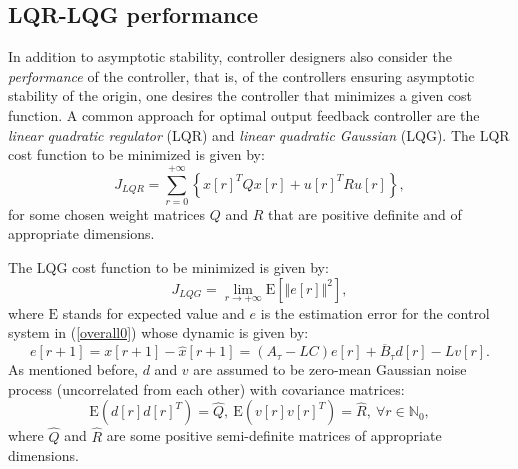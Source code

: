 \documentclass{amsart}
\numberwithin{equation}{section}
\newcommand{\N}{{\mathbb{N}}}
\begin{document}
\subsection{LQR-LQG performance}
In addition to asymptotic stability, controller designers also consider the {\em performance} of the controller,
that is, of the controllers ensuring asymptotic stability of the origin, one desires the controller that minimizes
a given cost function.
A common approach for optimal output feedback controller are the {\em linear quadratic regulator} (LQR) and {\em linear quadratic Gaussian} (LQG). 
The LQR cost function to be minimized is given by:
\begin{equation}
\label{LQR_cost}
J_{LQR}=\sum_{r=0}^{+\infty}\left\{x[r]^TQx[r]+u[r]^TRu[r]\right\},
\end{equation}
for some chosen weight matrices $Q$ and $R$ that are positive definite and of appropriate dimensions. 

The LQG cost function to be minimized is given by:
\begin{equation}\label{LQG}
J_{LQG}=\lim_{r\rightarrow+\infty}\text{E}\left[\Vert e[r]\Vert^2\right],
\end{equation}
where $\text{E}$ stands for expected value and $e$ is the estimation error for the control system in (\ref{overall0}) whose dynamic is given by:
\begin{equation}\label{stochastic_dyn}
e[r+1]=x[r+1]-\widehat{x}[r+1]=(A_\tau-LC)e[r]+\overline{B}_\tau d[r]-Lv[r].
\end{equation}
As mentioned before, $d$ and $v$ are assumed to be zero-mean Gaussian noise process (uncorrelated from each other) with covariance matrices:
\begin{equation}\label{spectrum}
\text{E}\left(d[r]d[r]^T\right)=\widehat{Q},~\text{E}\left(v[r]v[r]^T\right)=\widehat{R},~\forall r\in\N_0,
\end{equation}
where $\widehat{Q}$ and $\widehat{R}$ are some positive semi-definite matrices of appropriate dimensions.
\end{document}

